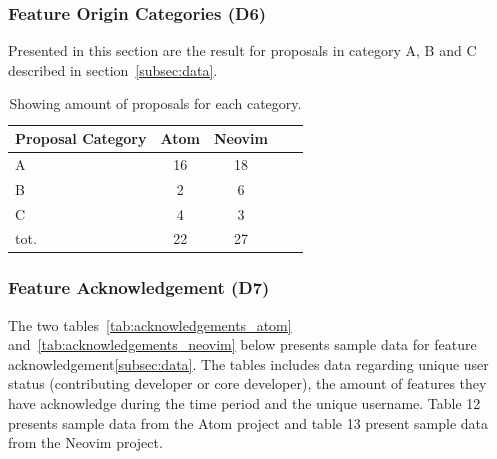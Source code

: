 \documentclass[a4paper,11pt]{article}
\begin{document}
{\FloatBarrier
\subsubsection{Feature Origin Categories (D6)}
Presented in this section are the result for proposals in category A, B and C described in section~\ref{subsec:data}.
\begin{table}[h]
	\centering
	\begin{tabular}{ | l | c | c | c | c |}
		\hline
		\textbf{Proposal Category} 	& \textbf{Atom} 	& \textbf{Neovim}	\\\hline
		A						& 16 			& 18				\\\hline
		B		 				& 2			& 6 	 			\\\hline
		C						& 4			& 3				\\\hline
		tot. 						& 22 			& 27 				\\
		\hline
	\end{tabular}
	\caption{Showing amount of proposals for each category.}
\end{table}

\FloatBarrier
\subsubsection{Feature Acknowledgement (D7)}
The two tables~\ref{tab:acknowledgements_atom} and~\ref{tab:acknowledgements_neovim} below presents sample data for feature acknowledgement\ref{subsec:data}. The tables includes data regarding unique user status (contributing developer or core developer), the amount of features they have acknowledge during the time period and the unique username. Table 12 presents sample data from the Atom project and table 13 present sample data from the Neovim project.

}
\end{document}
